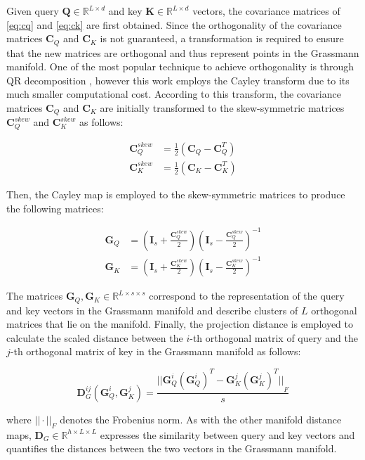 \documentclass[10pt,twocolumn,letterpaper]{article}
\begin{document}
Given query $\textbf{Q} \in \mathbb{R}^{L \times d}$ and key $\textbf{K} \in \mathbb{R}^{L \times d}$ vectors, the covariance matrices of \eqref{eq:cq} and \eqref{eq:ck} are first obtained. Since the orthogonality of the covariance matrices $\textbf{C}_Q$ and $\textbf{C}_K$ is not guaranteed, a transformation is required to ensure that the new matrices are orthogonal and thus represent points in the Grassmann manifold. One of the most popular technique to achieve orthogonality is through QR decomposition \cite{Author28}, however this work employs the Cayley transform \cite{Author58} due to its much smaller computational cost. According to this transform, the covariance matrices $\textbf{C}_Q$ and $\textbf{C}_K$ are initially transformed to the skew-symmetric matrices $\textbf{C}_Q^{skew}$ and $\textbf{C}_K^{skew}$ as follows:

\begin{align}
    \textbf{C}_Q^{skew} &= \frac{1}{2}(\textbf{C}_Q - \textbf{C}_Q^T) \\
    \textbf{C}_K^{skew} &= \frac{1}{2}(\textbf{C}_K - \textbf{C}_K^T)
\end{align}

Then, the Cayley map is employed to the skew-symmetric matrices to produce the following matrices:

\begin{align}
    \textbf{G}_Q &= (\textbf{I}_s + \frac{\textbf{C}_Q^{skew}}{2})(\textbf{I}_s - \frac{\textbf{C}_Q^{skew}}{2})^{-1} \\
    \textbf{G}_K &= (\textbf{I}_s + \frac{\textbf{C}_K^{skew}}{2})(\textbf{I}_s - \frac{\textbf{C}_K^{skew}}{2})^{-1}
\end{align}

The matrices $\textbf{G}_Q, \textbf{G}_K \in \mathbb{R}^{L \times s \times s}$ correspond to the representation of the query and key vectors in the Grassmann manifold and describe clusters of $L$ orthogonal matrices that lie on the manifold. Finally, the projection distance is employed to calculate the scaled distance between the $i$-th orthogonal matrix of query and the $j$-th orthogonal matrix of key in the Grassmann manifold as follows:

\begin{equation}
    \textbf{D}_{G}^{ij}(\textbf{G}_Q^i,\textbf{G}_K^j) = \frac{{||\textbf{G}_Q^i(\textbf{G}_Q^{i})^T - \textbf{G}_K^j(\textbf{G}_K^j)^T||}_F}{s}
    \label{eq:gdm}
\end{equation}

where ${|| \cdot ||}_F$ denotes the Frobenius norm. As with the other manifold distance maps, $\textbf{D}_{G} \in \mathbb{R}^{h\times L \times L}$ expresses the similarity between query and key vectors and quantifies the distances between the two vectors in the Grassmann manifold.
\end{document}
